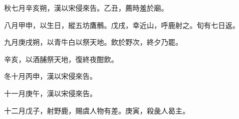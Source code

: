 \begin{pinyinscope}
 秋七月辛亥朔，漢以宋侵來告。乙丑，薦時羞於廟。



 八月甲申，以生日，縱五坊鷹鶻。戊戌，幸近山，呼鹿射之。旬有七日返。



 九月庚戌朔，以青牛白以祭天地。飲於野次，終夕乃罷。



 辛亥，以酒脯祭天地，復終夜酣飲。



 冬十月丙申，漢以宋侵來告。



 十一月庚午，漢以宋侵來告。



 十二月戊子，射野鹿，賜虞人物有差。庚寅，殺彘人曷主。



\end{pinyinscope}